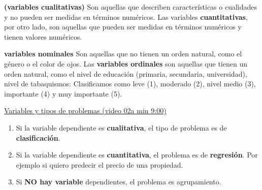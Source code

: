 \documentclass[../main.tex]{subfiles}
\begin{document}
        \begin{definition}\textbf{(variables cualitativas)} 
            Son aquellas que describen características o cualidades y no pueden ser medidas en términos numéricos. Las variables \textbf{cuantitativas}, por otro lado, son aquellas que pueden ser medidas en términos numéricos y tienen valores numéricos.
        \end{definition}
            
        \begin{definition}\textbf{variables nominales}
            Son aquellas que no tienen un orden natural, como el género o el color de ojos. Las \textbf{variables ordinales} son aquellas que tienen un orden natural, como el nivel de educación (primaria, secundaria, universidad), nivel de tabaquismos: Clasificamos como leve (1), moderado (2), nivel medio (3), importante (4) y muy importante (5).
        \end{definition}
    
        \underline{Variables y tipos de problemas (video 02a min 9:00)}
        \begin{enumerate}
            \item 
                Si la variable dependiente es \textbf{cualitativa}, el tipo de problema es de \textbf{clasificación}. 
            \item 
                Si la variable dependiente es \textbf{cuantitativa}, el problema es de \textbf{regresión}.
                Por ejemplo si quiero predecir el precio de una propiedad.
            \item 
                Si \textbf{NO hay variable} dependientes, el problema es agrupamiento.
        \end{enumerate}
        
\end{document}
